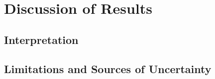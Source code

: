 \chapter{Discussion of Results}
\section{Interpretation}
\section{Limitations and Sources of Uncertainty}